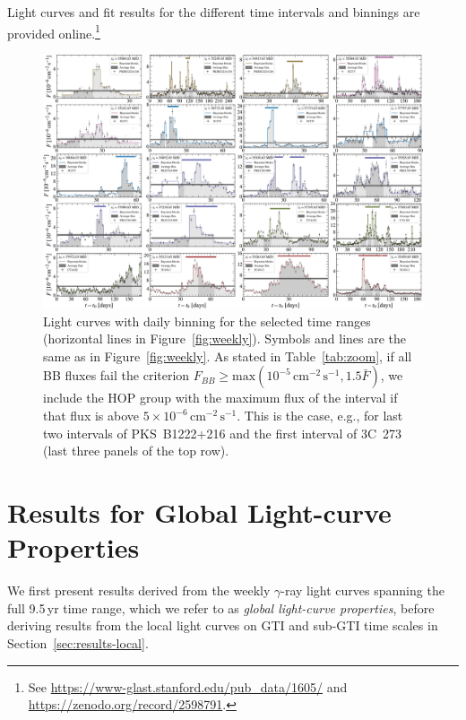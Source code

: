 \documentclass[twocolumn]{aastex62}
\newcommand{\gray}{$\gamma$-ray\xspace}
\begin{document}
Light curves and fit results for the different time intervals and binnings are provided online.\footnote{
See \url{https://www-glast.stanford.edu/pub_data/1605/} and \url{https://zenodo.org/record/2598791}.
}

\begin{figure}
    \centering
    \includegraphics[width = .99\linewidth]{lc_daily_tsmin9.pdf}
    \caption{\label{fig:daily} Light curves with daily binning for the selected time ranges (horizontal lines in Figure~\ref{fig:weekly}). Symbols and lines are the same as in Figure~\ref{fig:weekly}. 
    As stated in Table~\ref{tab:zoom}, if all BB fluxes fail the criterion $F_{BB} \geqslant \mathrm{max}(10^{-5}\,\mathrm{cm}^{-2}\,\mathrm{s}^{-1}, 1.5 \bar{F})$, we include the HOP group with the maximum flux of the interval if that flux is above $5\times 10^{-6}\,\mathrm{cm}^{-2}\,\mathrm{s}^{-1}$. This is the case, e.g., for last two intervals of PKS~B1222+216 and the first interval of 3C~273 (last three panels of the top row).}
\end{figure}

\section{Results for Global Light-curve Properties}
\label{sec:results-global}
We first present results derived from the weekly \gray light curves spanning the full 9.5\,yr time range, which we refer to as \emph{global light-curve properties}, before deriving results from the local light curves on GTI and sub-GTI time scales in Section~\ref{sec:results-local}.
\end{document}
